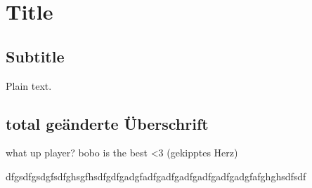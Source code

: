 \documentclass{article}
\begin{document}
\section{Title}

\subsection{Subtitle}

Plain text.

\subsection{total geänderte Überschrift}

what up player?
bobo is the best <3 (gekipptes Herz)

dfgsdfgsdgfsdfghsgfhsdfgdfgadgfadfgadfgadfgadfgadfgadgfafghghsdfsdf
\end{document}
